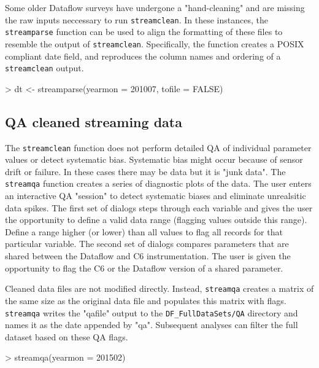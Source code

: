 \documentclass[12pt]{article}
\begin{document}
Some older Dataflow surveys have undergone a "hand-cleaning" and are missing the raw inputs neccessary to run \texttt{streamclean}. In these instances, the \texttt{streamparse} function can be used to align the formatting of these files to resemble the output of \texttt{streamclean}. Specifically, the function creates a POSIX compliant date field, and reproduces the column names and ordering of a \texttt{streamclean} output. 

\begin{Schunk}
\begin{Sinput}
> dt <- streamparse(yearmon = 201007, tofile = FALSE)
\end{Sinput}
\end{Schunk}


\subsection{QA cleaned streaming data}

The \texttt{streamclean} function does not perform detailed QA of individual parameter values or detect systematic bias. Systematic bias might occur because of sensor drift or failure. In these cases there may be data but it is "junk data". The \texttt{streamqa} function creates a series of diagnostic plots of the data. The user enters an interactive QA "session" to detect systematic biases and eliminate unrealsitic data spikes. The first set of dialogs steps through each variable and gives the user the opportunity to define a valid data range (flagging values outside this range). Define a range higher (or lower) than all values to flag all records for that particular variable. The second set of dialogs compares parameters that are shared between the Dataflow and C6 instrumentation. The user is given the opportunity to flag the C6 or the Dataflow version of a shared parameter. 

Cleaned data files are not modified directly. Instead, \texttt{streamqa} creates a matrix of the same size as the original data file and populates this matrix with flags. \texttt{streamqa} writes the "qafile" output to the \verb|DF_FullDataSets/QA| directory and names it as the date appended by "qa". Subsequent analyses can filter the full dataset based on these QA flags.

\begin{Schunk}
\begin{Sinput}
> streamqa(yearmon = 201502)
\end{Sinput}
\end{Schunk}
\end{document}
